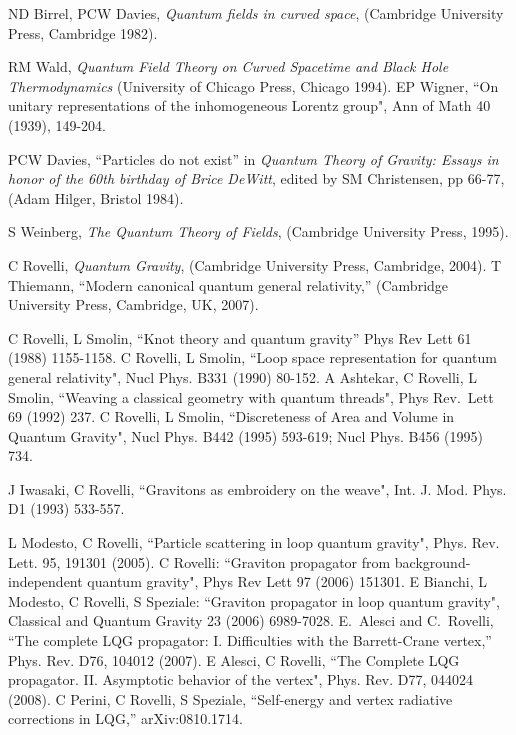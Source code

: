 \documentclass[10pt, nofootinbib]{revtex4}
\begin{document}
\begin{thebibliography}{9}


 ND Birrel, PCW Davies, {\it Quantum fields in curved
space}, (Cambridge University Press, Cambridge 1982).

 RM Wald, {\it Quantum Field Theory on Curved Spacetime
and Black Hole Thermodynamics} (University of Chicago Press, Chicago
1994).
 EP Wigner, ``On unitary representations of the 
inhomogeneous Lorentz group", Ann of Math {40} (1939), 149-204.

 PCW Davies, ``Particles do not exist'' in 
\textit{Quantum Theory of Gravity: Essays in honor of the 60th 
birthday of Brice DeWitt}, edited by SM Christensen,  pp 66-77, (Adam Hilger, 
Bristol 1984).

 S Weinberg, \textit{The Quantum Theory of 
Fields}, (Cambridge University Press, 1995). 


C Rovelli, {\em Quantum Gravity}, (Cambridge University Press,
Cambridge, 2004). 
T Thiemann, ``Modern canonical quantum general relativity,'' (Cambridge
  University Press, Cambridge, UK, 2007). 

C Rovelli, L Smolin,
 ``Knot theory and quantum gravity'' 
{Phys Rev Lett} {61} (1988) 1155-1158. 
C Rovelli, L Smolin,
``Loop space representation for quantum general relativity", 
{Nucl Phys.} {B331}  (1990) 80-152.
 A Ashtekar, C Rovelli, L Smolin,
 ``Weaving a classical geometry with quantum threads",
{Phys Rev.\ Lett}  {69}  (1992) 237.
C Rovelli, L Smolin,
 ``Discreteness of Area and Volume in Quantum Gravity", 
{Nucl Phys.} {B442} (1995)  593-619;
{Nucl Phys.} {B456}  (1995) 734.

J Iwasaki, C Rovelli, ``Gravitons as embroidery on the weave", 
Int. J. Mod. Phys. D1 (1993) 533-557.

L Modesto, C Rovelli, ``Particle scattering in
loop quantum gravity", Phys. Rev. Lett.  {95}, 191301 (2005).
C Rovelli:
``Graviton propagator from background-independent quantum gravity", 
Phys Rev Lett 97 (2006) 151301. 
E Bianchi, L Modesto, C Rovelli, S Speziale: 
``Graviton propagator in loop quantum gravity", 
Classical and  Quantum Gravity 23 (2006) 6989-7028.
  E.~Alesci and C.~Rovelli,
  ``The complete LQG propagator: I. Difficulties with the Barrett-Crane
  vertex,''
  Phys. Rev.  D76, 104012 (2007).
E Alesci, C Rovelli,
  ``The Complete LQG propagator. II. Asymptotic behavior of the vertex",  
Phys. Rev. D77,  044024 (2008). 
C Perini, C Rovelli, S Speziale,
  ``Self-energy and vertex radiative corrections in LQG,''   arXiv:0810.1714.
  

\end{thebibliography}
\end{document}
